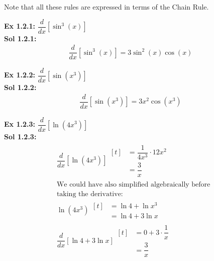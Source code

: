 \documentclass[11pt]{exam}
\newcommand{\diff}{\dfrac{d}{dx}}
\begin{document}
Note that all these rules are expressed in terms of the Chain Rule.


\textbf{Ex 1.2.1: } $\diff \left[\sin^3 (x)\right]$ \\[11pt]
\textbf{Sol 1.2.1: } \begin{align*}
    \diff \left[\sin^3 (x)\right] = \boxed{3\sin^2 (x)\cos (x)}
\end{align*} 

\textbf{Ex 1.2.2: } $\diff \left[\sin \left(x^3\right)\right]$ \\[11pt]
\textbf{Sol 1.2.2: } \begin{align*}
    \diff\left[\sin \left(x^3\right)\right] = \boxed{3x^2\cos  \left(x^3\right)}
\end{align*}

\textbf{Ex 1.2.3: } $\diff \left[\ln \left(4x^3\right)\right]$ \\[11pt]
\textbf{Sol 1.2.3: } \begin{align*}
    & \diff \left[\ln \left(4x^3\right)\right] \begin{aligned}[t]
        & = \dfrac{1}{4x^3} \cdot 12x^2 \\[11pt]
        & = \boxed{\dfrac{3}{x}} 
    \end{aligned} \\[11pt]
    & \text{We could have also simplified algebraically before} \\
    & \text{taking the derivative: } \\[11pt]
    & \ln \left(4x^3\right) \begin{aligned}[t]
        & = \ln 4 + \ln x^3 \\[11pt]
        & = \ln 4 + 3\ln x 
    \end{aligned} \\[11pt]
    & \diff \left[\ln 4 + 3\ln x\right] \begin{aligned}[t]
        & = 0 + 3 \cdot \dfrac{1}{x} \\
        & = \boxed{\dfrac{3}{x}}
    \end{aligned}
\end{align*}
\end{document}
